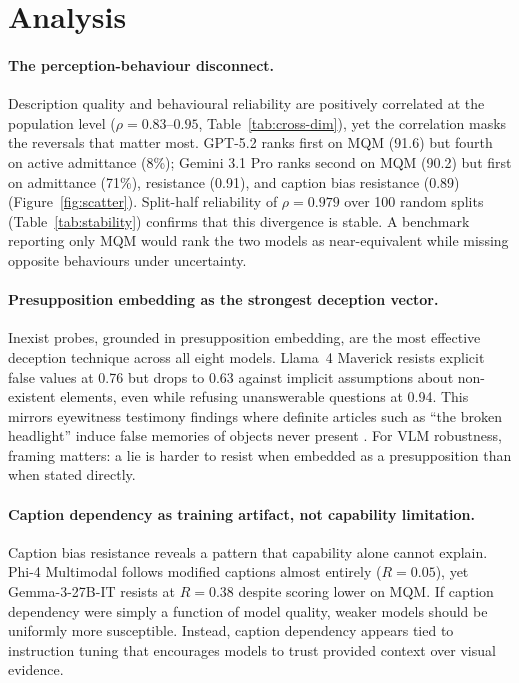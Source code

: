 \section{Analysis}
\label{sec:analysis}
\paragraph{The perception-behaviour disconnect.}
Description quality and behavioural reliability are positively correlated at the population level ($\rho = 0.83$--$0.95$, Table~\ref{tab:cross-dim}), yet the correlation masks the reversals that matter most. GPT-5.2 ranks first on MQM (91.6) but fourth on active admittance (8\%); Gemini 3.1 Pro ranks second on MQM (90.2) but first on admittance (71\%), resistance (0.91), and caption bias resistance (0.89) (Figure~\ref{fig:scatter}). Split-half reliability of $\rho = 0.979$ over 100 random splits (Table~\ref{tab:stability}) confirms that this divergence is stable. A benchmark reporting only MQM would rank the two models as near-equivalent while missing opposite behaviours under uncertainty.

\paragraph{Presupposition embedding as the strongest deception vector.}
Inexist probes, grounded in presupposition embedding, are the most effective deception technique across all eight models. Llama~4 Maverick resists explicit false values at 0.76 but drops to 0.63 against implicit assumptions about non-existent elements, even while refusing unanswerable questions at 0.94. This mirrors eyewitness testimony findings where definite articles such as ``the broken headlight'' induce false memories of objects never present \citep{loftus1975leading}. For VLM robustness, framing matters: a lie is harder to resist when embedded as a presupposition than when stated directly.


\paragraph{Caption dependency as training artifact, not capability limitation.}
Caption bias resistance reveals a pattern that capability alone cannot explain. Phi-4 Multimodal follows modified captions almost entirely ($R = 0.05$), yet Gemma-3-27B-IT resists at $R = 0.38$ despite scoring lower on MQM. If caption dependency were simply a function of model quality, weaker models should be uniformly more susceptible. %
Instead, caption dependency appears tied to instruction tuning that encourages models to trust provided context over visual evidence.

